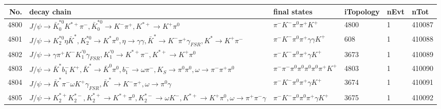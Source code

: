 \begin{table}[htbp] 
\begin{center}
\begin{small}
\begin{tabular}{rlllll}\hline\hline
 No. & decay chain & final states &  iTopology & nEvt & nTot \\\hline
4800&$J/\psi       \rightarrow \bar{K}_0^{*0}K^{*+}         \pi^{-}        , \bar{K}_0^{*0} \rightarrow K^{-}          \pi^{+}        , K^{*+}          \rightarrow K^{+}          \pi^{0}        $&$\pi^{-}        K^{-}          \pi^{0}        \pi^{+}        K^{+}          $& 4800&    1&410087\\
4801&$J/\psi       \rightarrow K_2^{*0}       \eta          \bar{K}^{*}   , K_2^{*0}        \rightarrow K^{*}          \pi^{0}        , \eta           \rightarrow \gamma       \gamma       , \bar{K}^{*}    \rightarrow K^{-}          \pi^{+}        \gamma_{FSR} , K^{*}           \rightarrow K^{+}          \pi^{-}        $&$\pi^{-}        K^{-}          \pi^{0}        \pi^{+}        \gamma       \gamma       K^{+}          $&  608&    1&410088\\
4802&$J/\psi       \rightarrow \gamma       \pi^{+}        K^{-}          K_1^{'0}      \gamma_{FSR} , K_1^{'0}       \rightarrow K^{*+}         \pi^{-}        , K^{*+}          \rightarrow K^{+}          \pi^{0}        $&$\pi^{-}        K^{-}          \pi^{0}        \pi^{+}        \gamma       K^{+}          $& 3673&    1&410089\\
4803&$J/\psi       \rightarrow \bar{K}^{*}   b_{1}^{-}      K^{+}          , \bar{K}^{*}    \rightarrow \bar{K}^{0}   \pi^{0}        , b_{1}^{-}       \rightarrow \omega         \pi^{-}        , K_{S}           \rightarrow \pi^{0}        \pi^{0}        , \omega          \rightarrow \pi^{-}        \pi^{+}        \pi^{0}        $&$\pi^{-}        \pi^{-}        \pi^{0}        \pi^{0}        \pi^{0}        \pi^{0}        \pi^{+}        K^{+}          $& 4803&    1&410090\\
4804&$J/\psi       \rightarrow \bar{K}^{*}   \pi^{-}        \omega         K^{+}          \gamma_{FSR} , \bar{K}^{*}    \rightarrow K^{-}          \pi^{+}        , \omega          \rightarrow \pi^{0}        \gamma       $&$\pi^{-}        K^{-}          \pi^{0}        \pi^{+}        \gamma       K^{+}          $& 3674&    1&410091\\
4805&$J/\psi       \rightarrow K_2^{*+}       K_2^{*-}       , K_2^{*+}        \rightarrow K^{*+}         \pi^{0}        , K_2^{*-}        \rightarrow \omega         K^{-}          , K^{*+}          \rightarrow K^{+}          \pi^{0}        , \omega          \rightarrow \pi^{+}        \pi^{-}        \gamma       $&$\pi^{-}        K^{-}          \pi^{0}        \pi^{0}        \pi^{+}        \gamma       K^{+}          $& 3675&    1&410092\\

\end{tabular}
\end{small}
\end{center}
\end{table}
